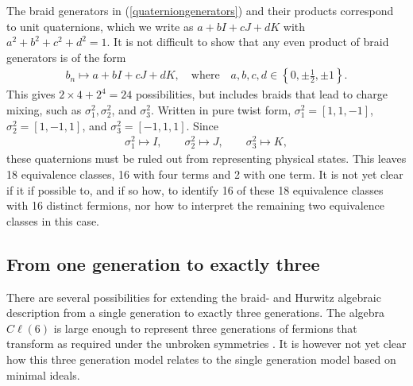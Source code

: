 \documentclass[a4paper]{jpconf}
\begin{document}
The braid generators in (\ref{quaterniongenerators}) and their products correspond to unit quaternions, which we write as $a+bI+cJ+dK$ with $a^2+b^2+c^2+d^2=1$. It is not difficult to show that any even product of braid generators is of the form 
\begin{eqnarray}\label{Hequivalence}
b_n\mapsto a+bI+cJ+dK,\quad \textrm{where} \quad a,b,c,d\in \left\lbrace 0, \pm \frac{1}{2}, \pm 1 \right\rbrace. 
\end{eqnarray}
This gives $2\times 4+2^4=24$ possibilities, but includes braids that lead to charge mixing, such as $\sigma_1^2,\sigma_2^2$, and $\sigma_3^2$. Written in pure twist form, $\sigma_1^2=[1,1,-1]$, $\sigma_2^2=[1,-1,1]$, and $\sigma_3^2=[-1,1,1]$. Since
\begin{eqnarray}
\sigma_1^2 \mapsto I,\qquad \sigma_2^2 \mapsto J,\qquad \sigma_3^2\mapsto K,
\end{eqnarray}
these quaternions must be ruled out from representing physical states. This leaves 18 equivalence classes, 16 with four terms and 2 with one term. It is not yet clear if it if possible to, and if so how, to identify 16 of these 18 equivalence classes with 16 distinct fermions, nor how to interpret the remaining two equivalence classes in this case.

\subsection{From one generation to exactly three}

There are several possibilities for extending the braid- and Hurwitz algebraic description from a single generation to exactly three generations. The algebra $C\ell(6)$ is large enough to represent three generations of fermions that transform as required under the unbroken symmetries \cite{furey2014generations}. It is however not yet clear how this three generation model relates to the single generation model based on minimal ideals. 
\end{document}
